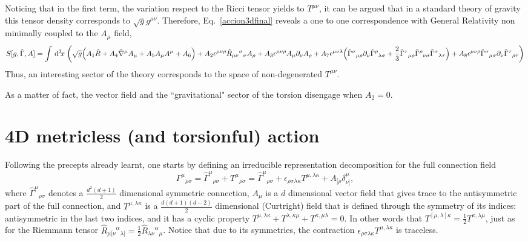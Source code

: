 \documentclass[twocolumn,
  showpacs,showkeys,prd,superscriptaddress]{revtex4-1}
\newcommand{\hl}[1]{{\color{red} \textbf{#1}}}
\begin{document}
Noticing that in  the first term, the variation respect to the Ricci tensor yields to $T^{\mu\nu}$, it can be argued that in a standard theory of gravity this tensor density corresponds to $\sqrt{g}g^{\mu\nu}$.
Therefore, Eq.~\eqref{accion3dfinal} reveals a one to one correspondence with General Relativity non minimally coupled to the $A_\mu$ field, %
\begin{dmath}
  \label{accion3dGR}
  S[g,\hat{\Gamma},A] = \int \dn{3}{x} \bigg(
  \sqrt{g} \Big(  A_1 \hat{R} + A_4\hat{\nabla}^\mu A_\mu + A_5 A_\mu A^\mu + A_6  \Big)
  + A_2\epsilon^{\mu\nu\rho} \hat{R}_{\mu\nu}{}^{\sigma}{}_\sigma A_\rho
  + A_3\epsilon^{\mu\nu\rho}A_\mu\partial_\nu A_\rho
  + A_7\epsilon^{\mu\nu\lambda}\Big(\hat{\Gamma}^{\sigma}{}_{\mu\rho}\partial_\nu\hat{\Gamma}^{\rho}{}_{\lambda\sigma}
  + \frac{2}{3}\hat{\Gamma}^{\tau}{}_{\mu\rho}\hat{\Gamma}^{\rho}{}_{\nu\sigma}{}\hat{\Gamma}^{\sigma}{}_{\lambda\tau}{}\Big)
  + A_8\epsilon^{\mu\nu\rho}\hat{\Gamma}^{\sigma}{}_{\mu\sigma}\partial_\nu\hat{\Gamma}^{\tau}{}_{\rho\tau}
  \bigg)
\end{dmath}
Thus, an interesting sector of the theory corresponds to the space of non-degenerated $T^{\mu\nu}$. 

As a matter of fact, the vector field and the ``gravitational" sector of the torsion disengage when $A_2=0$.


\section{4D metricless (and torsionful) action}

Following the precepts  already learnt, one starts  by defining an irreducible representation decomposition for the full connection field 
\begin{equation}
  \Gamma^\mu{}_{\rho\sigma} = \hat{\Gamma}^\mu{}_{\rho\sigma} + T^\mu{}_{\rho\sigma} = \hat{\Gamma}^\mu{}_{\rho\sigma} + \epsilon_{\rho\sigma\lambda\kappa}T^{\mu,\lambda\kappa}+A_{[\rho}\delta^\mu_{\nu]},
\end{equation}
where $\hat{\Gamma}^\mu{}_{\rho\sigma}$ denotes a $\tfrac{d^2(d+1)}{2}$ dimensional symmetric connection, $A_\mu$ is a $d$ dimensional vector field  that gives trace to the antisymmetric part of the full connection, and  $T^{\mu,\lambda\kappa}$ is a $\tfrac{d(d+1)(d-2)}{2}$ dimensional (Curtright) field that is defined through the symmetry of its indices: antisymmetric in the last two indices, and it has a cyclic property $T^{\mu,\lambda\kappa}+T^{\lambda,\kappa\mu}+T^{\kappa,\mu\lambda}=0$. In other words that $T^{[\mu,\lambda]\kappa}=\frac{1}{2}T^{\kappa,\lambda\mu}$, just as for  the Riemmann tensor $\hat{R}_{\mu[\nu}{}^\alpha{}_{\lambda]}=\frac{1}{2}\hat{R}_{\lambda\nu}{}^\alpha{}_{\mu}$. Notice that due to its symmetries, the contraction $\epsilon_{\rho\sigma\lambda\kappa}T^{\mu,\lambda\kappa}$ is traceless.
\end{document}
